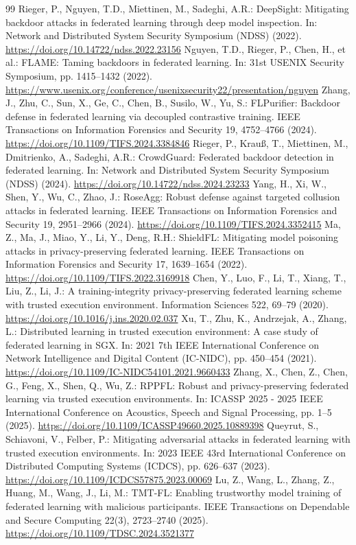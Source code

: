 \documentclass[runningheads,orivec]{llncs}
\begin{document}
\begin{thebibliography}{99}
     Rieger, P., Nguyen, T.D., Miettinen, M., Sadeghi, A.R.: DeepSight: Mitigating backdoor attacks in federated learning through deep model inspection. In: Network and Distributed System Security Symposium (NDSS) (2022). \url{https://doi.org/10.14722/ndss.2022.23156}
     Nguyen, T.D., Rieger, P., Chen, H., et al.: FLAME: Taming backdoors in federated learning. In: 31st USENIX Security Symposium, pp. 1415--1432 (2022). \url{https://www.usenix.org/conference/usenixsecurity22/presentation/nguyen}
     Zhang, J., Zhu, C., Sun, X., Ge, C., Chen, B., Susilo, W., Yu, S.: FLPurifier: Backdoor defense in federated learning via decoupled contrastive training. IEEE Transactions on Information Forensics and Security 19, 4752--4766 (2024). \url{https://doi.org/10.1109/TIFS.2024.3384846}
     Rieger, P., Krau{\ss}, T., Miettinen, M., Dmitrienko, A., Sadeghi, A.R.: CrowdGuard: Federated backdoor detection in federated learning. In: Network and Distributed System Security Symposium (NDSS) (2024). \url{https://doi.org/10.14722/ndss.2024.23233}
     Yang, H., Xi, W., Shen, Y., Wu, C., Zhao, J.: RoseAgg: Robust defense against targeted collusion attacks in federated learning. IEEE Transactions on Information Forensics and Security 19, 2951--2966 (2024). \url{https://doi.org/10.1109/TIFS.2024.3352415}
     Ma, Z., Ma, J., Miao, Y., Li, Y., Deng, R.H.: ShieldFL: Mitigating model poisoning attacks in privacy-preserving federated learning. IEEE Transactions on Information Forensics and Security 17, 1639--1654 (2022). \url{https://doi.org/10.1109/TIFS.2022.3169918}
     Chen, Y., Luo, F., Li, T., Xiang, T., Liu, Z., Li, J.: A training-integrity privacy-preserving federated learning scheme with trusted execution environment. Information Sciences 522, 69--79 (2020). \url{https://doi.org/10.1016/j.ins.2020.02.037}
     Xu, T., Zhu, K., Andrzejak, A., Zhang, L.: Distributed learning in trusted execution environment: A case study of federated learning in SGX. In: 2021 7th IEEE International Conference on Network Intelligence and Digital Content (IC-NIDC), pp. 450--454 (2021). \url{https://doi.org/10.1109/IC-NIDC54101.2021.9660433}
     Zhang, X., Chen, Z., Chen, G., Feng, X., Shen, Q., Wu, Z.: RPPFL: Robust and privacy-preserving federated learning via trusted execution environments. In: ICASSP 2025 - 2025 IEEE International Conference on Acoustics, Speech and Signal Processing, pp. 1--5 (2025). \url{https://doi.org/10.1109/ICASSP49660.2025.10889398}
     Queyrut, S., Schiavoni, V., Felber, P.: Mitigating adversarial attacks in federated learning with trusted execution environments. In: 2023 IEEE 43rd International Conference on Distributed Computing Systems (ICDCS), pp. 626--637 (2023). \url{https://doi.org/10.1109/ICDCS57875.2023.00069}
     Lu, Z., Wang, L., Zhang, Z., Huang, M., Wang, J., Li, M.: TMT-FL: Enabling trustworthy model training of federated learning with malicious participants. IEEE Transactions on Dependable and Secure Computing 22(3), 2723--2740 (2025). \url{https://doi.org/10.1109/TDSC.2024.3521377}


\end{thebibliography}
\end{document}
